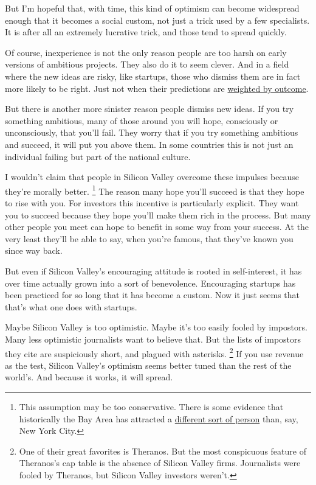 But I'm hopeful that, with time, this kind of optimism can become
widespread enough that it becomes a social custom, not just a trick used
by a few specialists. It is after all an extremely lucrative trick, and
those tend to spread quickly.

Of course, inexperience is not the only reason people are too harsh on
early versions of ambitious projects. They also do it to seem clever.
And in a field where the new ideas are risky, like startups, those who
dismiss them are in fact more likely to be right. Just not when their
predictions are \href{swan.html}{weighted by outcome}.

But there is another more sinister reason people dismiss new ideas. If
you try something ambitious, many of those around you will hope,
consciously or unconsciously, that you'll fail. They worry that if you
try something ambitious and succeed, it will put you above them. In some
countries this is not just an individual failing but part of the
national culture.

I wouldn't claim that people in Silicon Valley overcome these impulses
because they're morally better. \footnote{This assumption may be too conservative. There is some evidence
that historically the Bay Area has attracted a
\href{cities.html}{different sort of person} than, say, New York City.} The reason many
hope you'll succeed is that they hope to rise with you. For investors
this incentive is particularly explicit. They want you to succeed
because they hope you'll make them rich in the process. But many other
people you meet can hope to benefit in some way from your success. At
the very least they'll be able to say, when you're famous, that they've
known you since way back.

But even if Silicon Valley's encouraging attitude is rooted in
self-interest, it has over time actually grown into a sort of
benevolence. Encouraging startups has been practiced for so long that it
has become a custom. Now it just seems that that's what one does with
startups.

Maybe Silicon Valley is too optimistic. Maybe it's too easily fooled by
impostors. Many less optimistic journalists want to believe that. But
the lists of impostors they cite are suspiciously short, and plagued
with asterisks. \footnote{One of their great favorites is Theranos. But the most
conspicuous feature of Theranos's cap table is the absence of Silicon
Valley firms. Journalists were fooled by Theranos, but Silicon Valley
investors weren't.} If you use revenue as the test,
Silicon Valley's optimism seems better tuned than the rest of the
world's. And because it works, it will spread.


